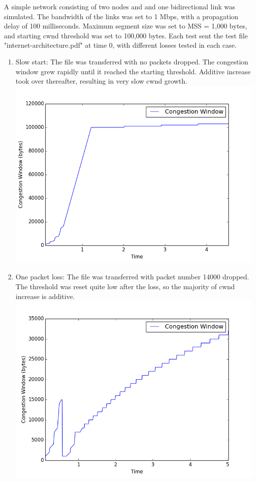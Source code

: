 \documentclass[fleqn,11pt]{article}
\begin{document}
A simple network consisting of two nodes and and one bidirectional link was simulated. The bandwidth of the links was set to 1 Mbps, with a propagation delay of 100 milliseconds. Maximum segment size was set to MSS = 1,000 bytes, and starting cwnd threshold was set to 100,000 bytes. Each test sent the test file "internet-architecture.pdf" at time 0, with different losses tested in each case.\\

\begin{enumerate}

\item Slow start: The file was transferred with no packets dropped. The congestion window grew rapidly until it reached the starting threshold. Additive increase took over thereafter, resulting in very slow cwnd growth. \\
\includegraphics[width=14cm]{graphs/cwnd0loss.png}
\newpage
\item One packet loss: The file was transferred with packet number 14000 dropped. The threshold was reset quite low after the loss, so the majority of cwnd increase is additive. \\
\includegraphics[width=14cm]{graphs/cwnd1loss.png} \\

\end{enumerate}
\end{document}
